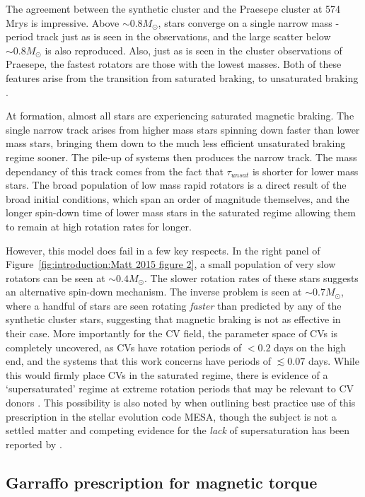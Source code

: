 The agreement between the synthetic cluster and the Praesepe cluster at 574 Mrys is impressive. Above $\sim 0.8 M_\odot$, stars converge on a single narrow mass - period track just as is seen in the observations, and the large scatter below $\sim 0.8 M_\odot$ is also reproduced. Also, just as is seen in the cluster observations of Praesepe, the fastest rotators are those with the lowest masses. Both of these features arise from the transition from saturated braking, to unsaturated braking \citep{matt2015}. 

At formation, almost all stars are experiencing saturated magnetic braking. The single narrow track arises from higher mass stars spinning down faster than lower mass stars, bringing them down to the much less efficient unsaturated braking regime sooner. The pile-up of systems then produces the narrow track. The mass dependancy of this track comes from the fact that $\tau_{unsat}$ is shorter for lower mass stars.
The broad population of low mass rapid rotators is a direct result of the broad initial conditions, which span an order of magnitude themselves, and the longer spin-down time of lower mass stars in the saturated regime allowing them to remain at high rotation rates for longer. 

However, this model does fail in a few key respects. In the right panel of Figure~\ref{fig:introduction:Matt 2015 figure 2}, a small population of very slow rotators can be seen at $\sim 0.4 M_\odot$. The slower rotation rates of these stars suggests an alternative spin-down mechanism. The inverse problem is seen at $\sim 0.7 M_\odot$, where a handful of stars are seen rotating {\it faster} than predicted by any of the synthetic cluster stars, suggesting that magnetic braking is not as effective in their case.
More importantly for the CV field, the parameter space of CVs is completely uncovered, as CVs have rotation periods of $< 0.2$ days on the high end, and the systems that this work concerns have periods of $\lesssim 0.07$ days. While this would firmly place CVs in the saturated regime, there is evidence of a `supersaturated' regime at extreme rotation periods that may be relevant to CV donors \citep{James2000, Wright2011, Argiroffi2016}. This possibility is also noted by \citet{Gossage2021} when outlining best practice use of this prescription in the stellar evolution code MESA, though the subject is not a settled matter and competing evidence for the {\it lack} of supersaturation has been reported by \citet{jeffries2011}.


\subsection{Garraffo prescription for magnetic torque}

